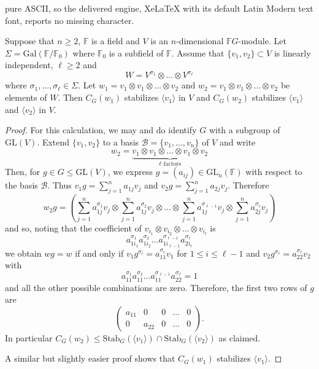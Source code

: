 \documentclass[10pt,a4paper]{amsart}
\newcommand{\GL}{\mathrm{GL}}
\newcommand{\Stab}{\mathrm{Stab}}
\begin{document}
pure ASCII, so the delivered engine, XeLaTeX with its default Latin Modern text font, reports no missing character.
\begin{lemma}\label{lem:no tensors}
Suppose that $n \ge 2$,  $\mathbb F $ is a field and $V$ is an $n$-dimensional $\mathbb FG$-module. Let $\Sigma= \mathrm{Gal}(\mathbb F/\mathbb F_0)$ where $\mathbb F_0$ is a subfield of $\mathbb F$.
 Assume that $\{v_1, v_2 \} \subset V$ is linearly independent,   $\ell \ge 2$ and  $$W= V^{\sigma_1}\otimes \dots  \otimes V^{\sigma_\ell}$$ where $\sigma_1,\dots, \sigma_\ell\in \Sigma$. Let $w_1= v_1 \otimes v_1\otimes \dots\otimes v_2$ and $w_2= v_1 \otimes v_1\otimes \dots\otimes v_2$ be elements of $W$.
Then $C_G(w_1)$ stabilizes $\langle v_1\rangle$ in $V$ and    $C_G(w_2)$ stabilizes $\langle v_1\rangle$ and $\langle v_2\rangle$ in $V$.
\end{lemma}

\begin{proof} For this calculation, we may and do identify $G$ with a subgroup of $\GL(V)$.
Extend $\{v_1, v_2 \}$ to a basis $\mathcal B=\{v_1, \dots, v_n\}$ of $V$ and write  $$w_2=\underbrace{v_1\otimes v_1\otimes \dots \otimes v_1\otimes v_2}_{\ell \text{ factors}}$$
Then, for $g\in G\le\GL(V)$, we express $g= (a_{ij})\in \GL_n(\mathbb F)$ with respect to the basis $\mathcal B$. Thus $v_1g= \sum_{j=1}^n a_{1j}v_j$ and $v_2g= \sum_{j=1}^n a_{2j}v_j$.
Therefore $$
w_2g= (\sum_{j=1}^n a_{1j}^{\sigma_1}v_j\otimes \sum_{j=1}^n a_{1j}^{\sigma_2}v_j\otimes \dots \otimes \sum_{j=1}^n a_{1j}^{\sigma_{\ell-1}}v_j\otimes \sum_{j=1}^n a_{2j}^{\sigma_\ell} v_j)$$
and so,   noting that the coefficient of $v_{i_1}\otimes v_{i_2}\otimes \dots \otimes v_{i_l}$  is $$a_{1i_1} ^{\sigma_1}a_{1i_2}^{\sigma_2}\dots a_{1i_{\ell-1}}^{\sigma_{\ell-1}} a_{2i_\ell}^{\sigma_\ell}$$ we obtain
 $wg=w$ if and only if $v_1g^{\sigma _i}=a_{11}^{\sigma _i }v_1$ for $1\le i \le \ell-1$ and  $v_2g^{\sigma_\ell}=
 a_{22}^{\sigma_\ell} v_2$ with
 $$a_{11} ^{\sigma_1}a_{11}^{\sigma_2}\dots a_{11}^{\sigma_{\ell-1}} a_{22}^{\sigma_\ell}=1$$ and all the other possible combinations are zero.
 Therefore,      the first two rows of $g$ are
$$\begin{pmatrix}a_{11}&0&0&\dots&0\\
0&a_{22}&0&\dots&0\end{pmatrix}.$$ In particular $C_G(w_2) \le \Stab_G(\langle v_1\rangle) \cap \Stab_G(\langle v_2\rangle)$ as claimed.

A similar but slightly easier proof shows that  $C_G(w_1)$ stabilizes $\langle v_1\rangle$.
\end{proof}
\end{document}
